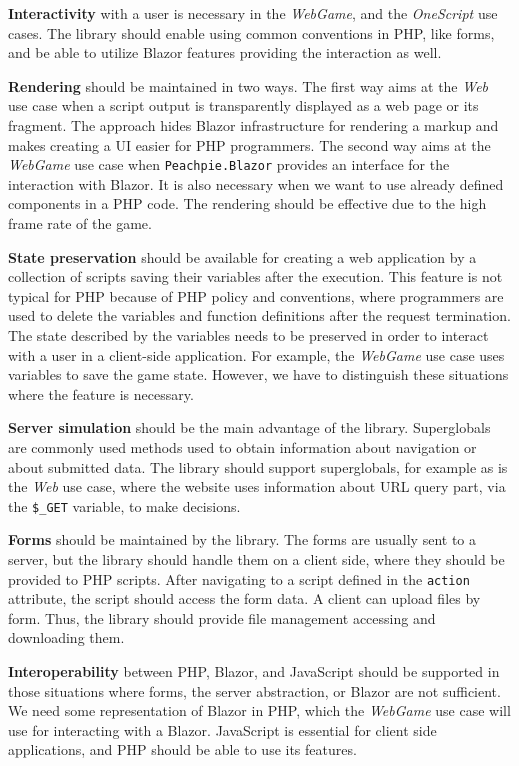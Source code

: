 \par
\textbf{Interactivity} with a user is necessary in the \textit{WebGame}, and the \textit{OneScript} use cases.
The library should enable using common conventions in PHP, like forms, and be able to utilize Blazor features providing the interaction as well.
\par
\textbf{Rendering} should be maintained in two ways.
The first way aims at the \textit{Web} use case when a script output is transparently displayed as a web page or its fragment.
The approach hides Blazor infrastructure for rendering a markup and makes creating a UI easier for PHP programmers.
The second way aims at the \textit{WebGame} use case when \texttt{Peachpie.Blazor} provides an interface for the interaction with Blazor.
It is also necessary when we want to use already defined components in a PHP code.
The rendering should be effective due to the high frame rate of the game.
\par
\textbf{State preservation} should be available for creating a web application by a collection of scripts saving their variables after the execution.
This feature is not typical for PHP because of PHP policy and conventions, where programmers are used to delete the variables and function definitions after the request termination.
The state described by the variables needs to be preserved in order to interact with a user in a client-side application. 
For example, the \textit{WebGame} use case uses variables to save the game state. 
However, we have to distinguish these situations where the feature is necessary.
\par
\textbf{Server simulation} should be the main advantage of the library.
Superglobals are commonly used methods used to obtain information about navigation or about submitted data.
The library should support superglobals, for example as is the \textit{Web} use case, where the website uses information about URL query part, via the \texttt{\$\_GET} variable, to make decisions.
\par
\textbf{Forms} should be maintained by the library. 
The forms are usually sent to a server, but the library should handle them on a client side, where they should be provided to PHP scripts.
After navigating to a script defined in the \texttt{action} attribute, the script should access the form data.
A client can upload files by form.
Thus, the library should provide file management accessing and downloading them.
\par
\textbf{Interoperability} between PHP, Blazor, and JavaScript should be supported in those situations where forms, the server abstraction, or Blazor are not sufficient.
We need some representation of Blazor in PHP, which the \textit{WebGame} use case will use for interacting with a Blazor.
JavaScript is essential for client side applications, and PHP should be able to use its features.

